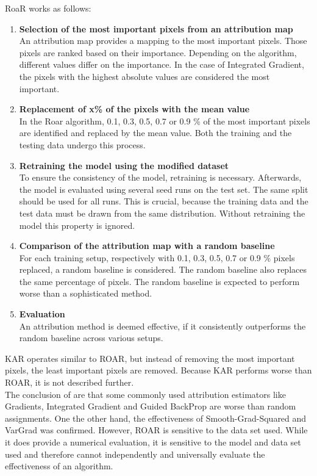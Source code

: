 RoaR  works as follows:
\begin{enumerate}
	\item \textbf{ Selection of the most important pixels from an attribution map}\\
	An attribution map provides a mapping to the most important pixels. Those pixels are ranked based on their importance. Depending on the algorithm, different values differ on the importance. In the case of Integrated Gradient, the pixels with the highest absolute values are considered the most important.
	\item \textbf{ Replacement of x\% of the pixels with the mean value}\\
	In the Roar algorithm, 0.1, 0.3, 0.5, 0.7 or 0.9 \% of the most important pixels are identified and replaced by the mean value. Both the training and the testing data undergo this process.
	\item \textbf{ Retraining the model using the modified dataset}\\
	To ensure the consistency of the model, retraining is necessary. Afterwards, the model is evaluated using several seed runs on the test set. The same split should be used for all runs.
	This is crucial, because the training data and the test data must be drawn from the same distribution. Without retraining the model this property is ignored.
	\item \textbf{ Comparison of the attribution map with a random baseline} \\
	For each training setup, respectively with 0.1, 0.3, 0.5, 0.7 or 0.9 \% pixels replaced, a random baseline is considered. The random baseline also replaces the same percentage of pixels. The random baseline is expected to perform worse than a sophisticated method.
	\item \textbf{ Evaluation} \\
	An attribution method is deemed effective, if it consistently outperforms the random baseline across various setups.
\end{enumerate}

KAR operates similar to ROAR, but instead of removing the most important pixels, the least important pixels are removed. Because KAR performs worse than ROAR, it is not described further.
\\
The conclusion of \cite{hooker2019benchmark} are  that some commonly used attribution estimators like Gradients, Integrated Gradient and Guided BackProp are worse than random assignments. One the other hand, the effectiveness of Smooth-Grad-Squared and VarGrad was confirmed. However, ROAR is sensitive to the data set used. While it does provide a numerical evaluation, it is sensitive to the model and data set used and therefore cannot independently and universally evaluate the effectiveness of an algorithm.


